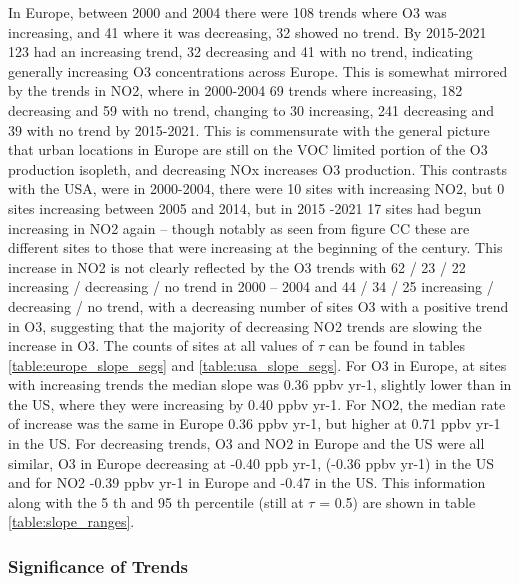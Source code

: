 \documentclass[journal abbreviation, manuscript]{copernicus}
\begin{document}
In Europe, between 2000 and 2004 there were 108 trends where O3 was increasing, and 41 where it was decreasing, 32 showed no trend. By 2015-2021 123 had an increasing trend, 32 decreasing and 41 with no trend, indicating generally increasing O3 concentrations across Europe. This is somewhat mirrored by the trends in NO2, where in 2000-2004 69 trends where increasing, 182 decreasing and 59 with no trend, changing to 30 increasing, 241 decreasing and 39 with no trend by 2015-2021. This is commensurate with the general picture that urban locations in Europe are still on the VOC limited portion of the O3 production isopleth, and decreasing NOx increases O3 production. 
This contrasts with the USA, were in 2000-2004, there were 10 sites with increasing NO2, but 0 sites increasing between 2005 and 2014, but in 2015 -2021 17 sites had begun increasing in NO2 again – though notably as seen from figure CC these are different sites to those that were increasing at the beginning of the century. This increase in NO2 is not clearly reflected by the O3 trends with 62 / 23 / 22 increasing / decreasing / no trend in 2000 – 2004 and 44 / 34 / 25 increasing / decreasing / no trend, with a decreasing number of sites O3 with a positive trend in O3, suggesting that the majority of decreasing NO2 trends are slowing the increase in O3. The counts of sites at all values of $\tau$ can be found in tables \ref{table:europe_slope_segs} and \ref{table:usa_slope_segs}. 
For O3 in Europe, at sites with increasing trends the median slope was 0.36 ppbv yr-1, slightly lower than in the US, where they were increasing by 0.40 ppbv yr-1. For NO2, the median rate of increase was the same in Europe 0.36 ppbv yr-1, but higher at 0.71 ppbv yr-1 in the US. For decreasing trends, O3 and NO2 in Europe and the US were all similar, O3 in Europe decreasing at -0.40 ppb yr-1, (-0.36 ppbv yr-1) in the US and for NO2 -0.39 ppbv yr-1 in Europe and -0.47 in the US. This information along with the 5 th and 95 th percentile (still at $\tau$ = 0.5) are shown in table \ref{table:slope_ranges}. 










\subsubsection{Significance of Trends}
\end{document}
